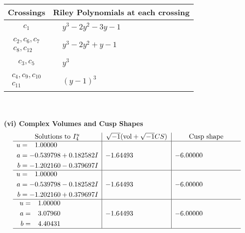 \documentclass[1p]{elsarticle_modified}
\theoremstyle{definition}
\newcommand{\I}{\sqrt{-1}}
\begin{document}
\begin{tabular}{m{50pt}|m{274pt}}
Crossings & \hspace{64pt}Riley Polynomials at each crossing \\
\hline $$\begin{aligned}c_{1}\end{aligned}$$&$\begin{aligned}
&y^3-2 y^2-3 y-1
\end{aligned}$\\
\hline $$\begin{aligned}c_{2},c_{6},c_{7}\\c_{8},c_{12}\end{aligned}$$&$\begin{aligned}
&y^3-2 y^2+y-1
\end{aligned}$\\
\hline $$\begin{aligned}c_{3},c_{5}\end{aligned}$$&$\begin{aligned}
&y^3
\end{aligned}$\\
\hline $$\begin{aligned}c_{4},c_{9},c_{10}\\c_{11}\end{aligned}$$&$\begin{aligned}
&(y-1)^3
\end{aligned}$\\
\hline
\end{tabular}\\~\\
\newpage\flushleft \textbf{(vi) Complex Volumes and Cusp Shapes}
$$\begin{array}{c|c|c}  
\text{Solutions to }I^u_{4}& \I (\text{vol} + \sqrt{-1}CS) & \text{Cusp shape}\\
 \hline 
\begin{aligned}
u &= \phantom{-}1.00000\phantom{ +0.000000I} \\
a &= -0.539798 + 0.182582 I \\
b &= -1.202160 - 0.379697 I\end{aligned}
 & -1.64493\phantom{ +0.000000I} & -6.00000\phantom{ +0.000000I} \\ \hline\begin{aligned}
u &= \phantom{-}1.00000\phantom{ +0.000000I} \\
a &= -0.539798 - 0.182582 I \\
b &= -1.202160 + 0.379697 I\end{aligned}
 & -1.64493\phantom{ +0.000000I} & -6.00000\phantom{ +0.000000I} \\ \hline\begin{aligned}
u &= \phantom{-}1.00000\phantom{ +0.000000I} \\
a &= \phantom{-}3.07960\phantom{ +0.000000I} \\
b &= \phantom{-}4.40431\phantom{ +0.000000I}\end{aligned}
 & -1.64493\phantom{ +0.000000I} & -6.00000\phantom{ +0.000000I}\\
 \hline 
 \end{array}$$\newpage\newpage\renewcommand{\arraystretch}{1}
\end{document}
